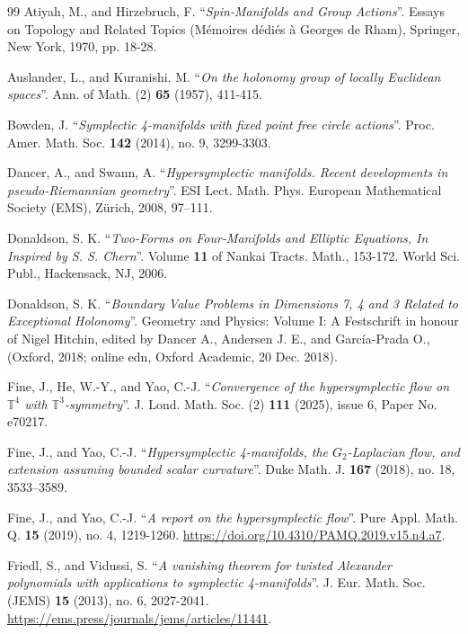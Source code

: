 \documentclass[11pt]{amsart}
\theoremstyle{plain}
\theoremstyle{definition}
\theoremstyle{plain}
\theoremstyle{definition}
\numberwithin{equation}{section}
\numberwithin{theorem}{section}
\begin{document}
\begin{thebibliography}{99}
Atiyah, M., and Hirzebruch, F. ``\emph{Spin-Manifolds and Group Actions}''. Essays on Topology and Related Topics (M\'emoires d\'edi\'es \`a Georges de Rham), Springer, New York, 1970, pp. 18-28. 

Auslander, L., and Kuranishi, M.
``\emph{On the holonomy group of locally Euclidean spaces}''.
Ann. of Math. (2) {\bf{65}} (1957), 411-415.

Bowden, J. ``\emph{Symplectic 4-manifolds with fixed point free circle actions}''. Proc. Amer. Math. Soc. {\bf{142}} (2014), no. 9, 3299-3303.


Dancer, A., and Swann, A. ``\emph{Hypersymplectic manifolds. Recent developments in pseudo-Riemannian geometry}''. ESI Lect. Math. Phys. European Mathematical Society (EMS), Z\"urich, 2008, 97–111.

Donaldson, S. K. ``\emph{Two-Forms on Four-Manifolds and Elliptic Equations, In Inspired by S. S. Chern}''. Volume {\bf{11}} of Nankai Tracts. Math., 153-172. World Sci. Publ., Hackensack, NJ, 2006.


Donaldson, S. K. ``\emph{Boundary Value Problems in Dimensions 7, 4 and 3 Related to Exceptional Holonomy}''. Geometry and Physics: Volume I: A Festschrift in honour of Nigel Hitchin, edited by Dancer A., Andersen J. E., and Garc\'ia-Prada O., (Oxford, 2018; online edn, Oxford Academic, 20 Dec. 2018).



Fine, J., He, W.-Y., and Yao, C.-J. ``\emph{Convergence of the hypersymplectic flow on $\mathbb{T}^4$ with $\mathbb{T}^3$-symmetry}''. J. Lond. Math. Soc. (2) {\bf{111}} (2025), issue 6, Paper No. e70217.
 
    
Fine, J., and Yao, C.-J. ``\emph{Hypersymplectic 4-manifolds, the $G_2$-Laplacian flow, and extension assuming bounded scalar curvature}''. Duke Math. J. {\bf{167}} (2018), no. 18, 3533–3589.
	
	
Fine, J., and Yao, C.-J. ``\emph{A report on the hypersymplectic flow}''. Pure Appl. Math. Q. {\bf{15}} (2019), no. 4, 1219-1260. \url{https://doi.org/10.4310/PAMQ.2019.v15.n4.a7}.
	
  
Friedl, S., and Vidussi, S. ``\emph{A vanishing theorem for twisted Alexander polynomials with applications to symplectic 4-manifolds}''. J. Eur. Math. Soc. (JEMS) {\bf{15}} (2013), no. 6, 2027-2041. \url{https://ems.press/journals/jems/articles/11441}.


\end{thebibliography}
\end{document}
